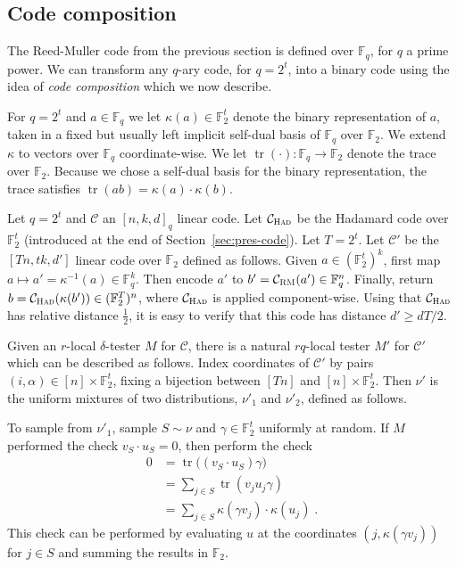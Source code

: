 \documentclass[11pt]{article}
\theoremstyle{definition}
\newcommand{\code}{\mathcal{C}}
\newcommand{\F}{\ensuremath{\mathbb{F}}}
\newcommand{\mC}{\ensuremath{\mathcal{C}}}
\newcommand{\mX}{\ensuremath{\mathcal{X}}}
\newcommand{\RM}{\ensuremath{\textsc{RM}}}
\newcommand{\Had}{\ensuremath{\textsc{Had}}}
\DeclareMathOperator{\poly}{poly}
\newcommand{\eps}{\varepsilon}
\DeclareMathOperator{\tr}{tr}
\begin{document}


\subsection{Code composition}
\label{sec:code-comp}

 The Reed-Muller code from the previous section is defined over $\F_q$, for $q$ a prime power. We can transform any $q$-ary code, for $q=2^t$, into a binary code using the idea of \emph{code composition} which we now describe. 

For $q=2^t$ and $a\in \F_q$ we let $\kappa(a)\in\F_2^t$ denote the binary representation of $a$, taken in a fixed but usually left implicit self-dual basis of $\F_{q}$ over $\F_2$. We extend $\kappa$ to vectors over $\F_q$ coordinate-wise. We let $\tr(\cdot):\F_q\to\F_2$ denote the trace over $\F_2$. Because we chose a self-dual basis for the binary representation, the trace satisfies $\tr(ab)=\kappa(a)\cdot\kappa(b)$. 

Let $q=2^t$ and $\code$ an $[n,k,d]_q$ linear code. Let $\code_{\Had}$ be the Hadamard code over $\F_2^t$ (introduced at the end of Section~\ref{sec:pres-code}). Let $T=2^t$.
Let $\mC'$ be the $[Tn,tk,d']$ linear code over $\F_2$ defined as follows. Given $a\in (\F_2^t)^{k}$, first map $a\mapsto a'=\kappa^{-1}(a) \in \F_q^{k}$. Then encode $a'$ to $b'=\code_\RM(a')\in \F_q^n$. Finally, return $b=\code_\Had(\kappa(b'))\in(\F_2^T)^n$, where $\code_\Had$ is applied component-wise. Using that $\code_\Had$ has relative distance $\frac{1}{2}$, it is easy to verify that this code has distance $d'\geq dT/2$.

Given an $r$-local $\delta$-tester $M$ for $\code$, there is a natural $rq$-local tester $M'$ for $\code'$ which can be described as follows. Index coordinates of $\code'$ by pairs $(i,\alpha)\in [n]\times\F_2^t$, fixing a bijection between $[Tn]$ and $[n]\times \F_2^t$. Then $\nu'$ is the uniform mixtures of two distributions, $\nu'_1$ and $\nu'_2$, defined as follows. 

To sample from $\nu'_1$, sample $S\sim\nu$ and $\gamma\in \F_2^t$ uniformly at random. If $M$ performed the check $v_S \cdot u_S=0$, then perform the check 
\begin{align*}
0 &= \tr\big(( v_S \cdot u_S) \gamma\big)\\
&= \sum_{j\in S} \tr( v_{j} u_j \gamma) \\
&= \sum_{j\in S} \kappa(\gamma v_{j}) \cdot \kappa(u_j)\;.
\end{align*}
This check can be performed by evaluating $u$ at the coordinates $(j,\kappa(\gamma  v_{j}))$ for $j\in S$ and summing the results in $\F_2$. 
\end{document}
